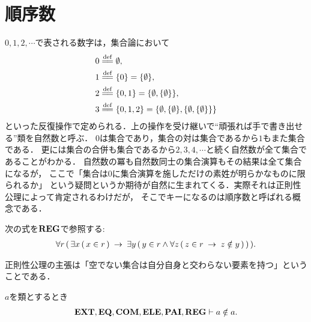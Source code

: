 \section{順序数}
	$0,1,2,\cdots$で表される数字は，集合論において
	\begin{align}
		0 &\defeq \emptyset, \\
		1 &\defeq \{0\} = \{\emptyset\}, \\
		2 &\defeq \{0,1\} = \{\emptyset,\{\emptyset\}\}, \\
		3 &\defeq \{0,1,2\} = \{\emptyset,\{\emptyset\},\{\emptyset,\{\emptyset\}\}\}
	\end{align}
	といった反復操作で定められる．上の操作を受け継いで``頑張れば手で書き出せる''類を自然数と呼ぶ．
	$0$は集合であり，集合の対は集合であるから$1$もまた集合である．
	更には集合の合併も集合であるから$2,3,4,\cdots$と続く自然数が全て集合であることがわかる．
	自然数の冪も自然数同士の集合演算もその結果は全て集合になるが，
	ここで「集合は$0$に集合演算を施しただけの素姓が明らかなものに限られるか」
	という疑問というか期待が自然に生まれてくる．実際それは正則性公理によって肯定されるわけだが，
	そこでキーになるのは順序数と呼ばれる概念である．
	
	\begin{screen}
		\begin{axm}[正則性公理]
			次の式を$\mbox{{\bf REG}}$で参照する:
			\begin{align}
				\forall r\, (\, \exists x\, (\, x \in r\, )
				\hspace{0.25em}\rightarrow\hspace{0.25em} \exists y\, (\, y \in r \wedge \forall z\, 
				(\, z \in r \hspace{0.25em}\rightarrow\hspace{0.25em} z \notin y\, )\, )\, ).
			\end{align}
		\end{axm}
	\end{screen}
	
	正則性公理の主張は「空でない集合は自分自身と交わらない要素を持つ」ということである．
	
	\begin{screen}
		\begin{thm}[類は自分自身を要素に持たない]
		\label{thm:no_class_contains_itself}
			$a$を類とするとき
			\begin{align}
				\mbox{{\bf EXT}},\mbox{{\bf EQ}},\mbox{\bf COM},\mbox{{\bf ELE}},\mbox{{\bf PAI}},\mbox{{\bf REG}} \vdash a \notin a.
			\end{align}
		\end{thm}
	\end{screen}
	
